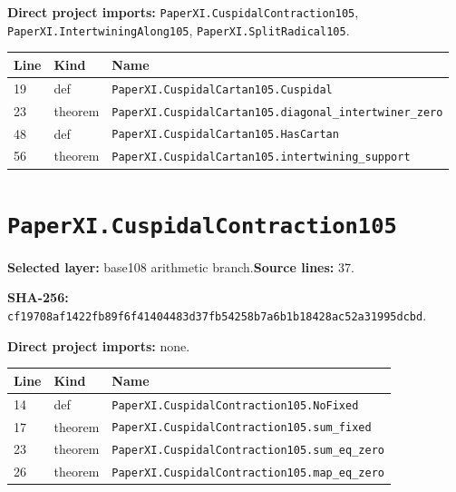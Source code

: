 \documentclass[10pt,oneside]{book}
\begin{document}
\textbf{Direct project imports:} \nolinkurl{PaperXI.CuspidalContraction105}, \nolinkurl{PaperXI.IntertwiningAlong105}, \nolinkurl{PaperXI.SplitRadical105}.

\begin{longtable}{@{}p{}p{}p{}@{}}\toprule Line&Kind&Name\\\midrule\endhead

19&def&\nolinkurl{PaperXI.CuspidalCartan105.Cuspidal}\\

23&theorem&\nolinkurl{PaperXI.CuspidalCartan105.diagonal_intertwiner_zero}\\

48&def&\nolinkurl{PaperXI.CuspidalCartan105.HasCartan}\\

56&theorem&\nolinkurl{PaperXI.CuspidalCartan105.intertwining_support}\\

\bottomrule\end{longtable}

\section{\texorpdfstring{\nolinkurl{PaperXI.CuspidalContraction105}}{PaperXI.CuspidalContraction105}}\label{module:PaperXI.CuspidalContraction105}

\textbf{Selected layer:} base108 arithmetic branch.\quad\textbf{Source lines:} 37.\par\textbf{SHA-256:} {\scriptsize\nolinkurl{cf19708af1422fb89f6f41404483d37fb54258b7a6b1b18428ac52a31995dcbd}}.


\textbf{Direct project imports:} none.

\begin{longtable}{@{}p{}p{}p{}@{}}\toprule Line&Kind&Name\\\midrule\endhead

14&def&\nolinkurl{PaperXI.CuspidalContraction105.NoFixed}\\

17&theorem&\nolinkurl{PaperXI.CuspidalContraction105.sum_fixed}\\

23&theorem&\nolinkurl{PaperXI.CuspidalContraction105.sum_eq_zero}\\

26&theorem&\nolinkurl{PaperXI.CuspidalContraction105.map_eq_zero}\\

\bottomrule\end{longtable}
\end{document}
